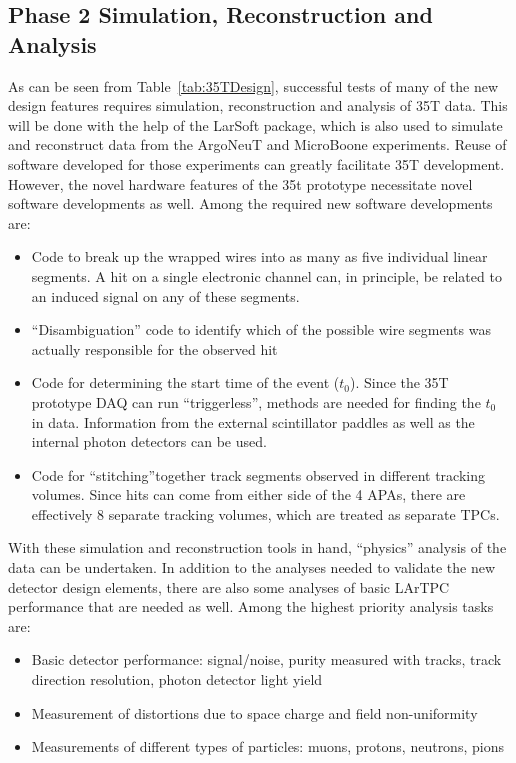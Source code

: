 \subsection{Phase 2 Simulation, Reconstruction and Analysis}
As can be seen from Table~\ref{tab:35TDesign}, successful tests of many of the new 
design features requires simulation, reconstruction and analysis of 35T data. 
This will be done with the help of the LarSoft package, which is also used to simulate and 
reconstruct data from the ArgoNeuT and MicroBoone experiments.
Reuse of software developed for those experiments can greatly facilitate 35T development. 
However, the novel hardware features of the 35t prototype necessitate novel software developments 
as well.
Among the required new software developments are:
\begin{itemize}
\item{Code to break up the wrapped wires into as many as five individual linear segments. 
A hit on a single electronic channel can, in principle, be related to an induced signal on any of these segments.}
\item{``Disambiguation'' code to identify which of the possible wire segments was actually responsible
for the observed hit}
\item{Code for determining the start time of the event ($t_0$). Since the 35T prototype DAQ can
run ``triggerless'', methods are needed for finding the $t_0$ in data. Information from the external 
scintillator paddles as well as the internal photon detectors can be used.}
\item{Code for ``stitching''together track segments observed in different tracking volumes. 
Since hits can come from either side of the 4 APAs, there are effectively 8 separate tracking volumes, 
which are treated as separate TPCs.}
\end{itemize}

With these simulation and reconstruction tools in hand, ``physics'' analysis of the data can be undertaken.
In addition to the analyses needed to validate the new detector design elements, there are also
some analyses of basic LArTPC performance that are needed as well.
Among the highest priority analysis tasks are:

\begin{itemize}
\item{Basic detector performance: signal/noise, purity measured with tracks, track direction resolution, 
photon detector light yield}
\item{Measurement of distortions due to space charge and field non-uniformity}
\item{Measurements of different types of particles: muons, protons, neutrons, pions}
\end{itemize}

